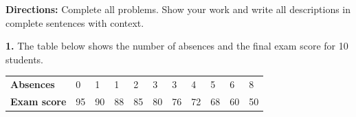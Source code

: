\documentclass[10pt]{article}
\begin{document}
\namedateperiod

\vspace{0.18in}

\noindent\textbf{Directions:} Complete all problems. Show your work and write all
descriptions in complete sentences with context.

\vspace{0.14in}

\noindent\textbf{1.} The table below shows the number of absences and the final exam score
for 10 students.

\vspace{8pt}
\renewcommand{\arraystretch}{1.4}
\begin{tabularx}{\linewidth}{@{} l *{10}{C{0.9cm}} @{}}
\textbf{Absences} & 0 & 1 & 1 & 2 & 3 & 3 & 4 & 5 & 6 & 8 \\
\textbf{Exam score} & 95 & 90 & 88 & 85 & 80 & 76 & 72 & 68 & 60 & 50 \\
\end{tabularx}

\vspace{10pt}
\end{document}
